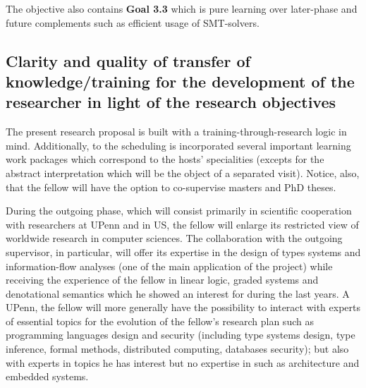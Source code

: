 \documentclass{article}[11pt]
\begin{document}
The objective also contains {\bf Goal 3.3} which is pure learning over later-phase and future complements such as efficient usage of SMT-solvers.

%
%

\subsection{Clarity and quality of transfer of knowledge/training for the development of the researcher in light of the research objectives}
The present research proposal is built with a training-through-research logic in mind. Additionally, to the scheduling is incorporated several important learning work packages which correspond to the hosts' specialities (excepts for the abstract interpretation which will be the object of a separated visit). Notice, also, that the fellow will have the option to co-supervise masters and PhD theses.

During the outgoing phase, which will consist primarily in scientific cooperation with researchers at UPenn and in US, the fellow will enlarge its restricted view of worldwide research in computer sciences. The collaboration with the outgoing supervisor, in particular, will offer its expertise in the design of types systems and information-flow analyses (one of the main application of the project) while receiving the experience of the fellow in linear logic, graded systems and denotational semantics which he showed an interest for during the last years. A UPenn, the fellow will more generally have the possibility to interact with experts of essential topics for the evolution of the fellow’s research plan such as programming languages design and security (including type systems design, type inference, formal methods, distributed computing, databases security); but also with experts in topics he has interest but no expertise in such as architecture and embedded systems.
\end{document}
